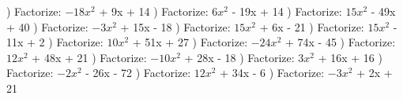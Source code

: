 \documentclass{article}%
\begin{document}
\newline%
) Factorize: $-18x^2$ + 9x + 14%
\newline%
\newline%
) Factorize: $6x^2$ - 19x + 14%
\newline%
\newline%
) Factorize: $15x^2$ - 49x + 40%
\newline%
\newline%
) Factorize: $-3x^2$ + 15x - 18%
\newline%
\newline%
) Factorize: $15x^2$ + 6x - 21%
\newline%
\newline%
) Factorize: $15x^2$ - 11x + 2%
\newline%
\newline%
) Factorize: $10x^2$ + 51x + 27%
\newline%
\newline%
) Factorize: $-24x^2$ + 74x - 45%
\newline%
\newline%
) Factorize: $12x^2$ + 48x + 21%
\newline%
\newline%
) Factorize: $-10x^2$ + 28x - 18%
\newline%
\newline%
) Factorize: $3x^2$ + 16x + 16%
\newline%
\newline%
) Factorize: $-2x^2$ - 26x - 72%
\newline%
\newline%
) Factorize: $12x^2$ + 34x - 6%
\newline%
\newline%
) Factorize: $-3x^2$ + 2x + 21%
\newline%
\newline%
\end{document}
